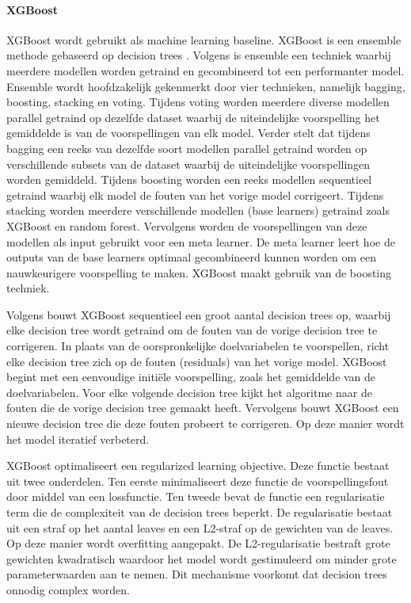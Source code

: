 \paragraph{XGBoost}

XGBoost wordt gebruikt als machine learning baseline. XGBoost is een ensemble methode gebaseerd op decision trees \autocite{Chen2016}. Volgens \textcite{Mahajan2023} is ensemble een techniek waarbij meerdere modellen worden getraind en gecombineerd tot een performanter model. Ensemble wordt hoofdzakelijk gekenmerkt door vier technieken, namelijk bagging, boosting, stacking en voting. Tijdens voting worden meerdere diverse modellen parallel getraind op dezelfde dataset waarbij de uiteindelijke voorspelling het gemiddelde is van de voorspellingen van elk model. Verder stelt \textcite{Zhang2022} dat tijdens bagging een reeks van dezelfde soort modellen parallel getraind worden op verschillende subsets van de dataset waarbij de uiteindelijke voorspellingen worden gemiddeld. Tijdens boosting worden een reeks modellen sequentieel getraind waarbij elk model de fouten van het vorige model corrigeert. Tijdens stacking worden meerdere verschillende modellen (base learners) getraind zoals XGBoost en random forest. Vervolgens worden de voorspellingen van deze modellen als input gebruikt voor een meta learner. De meta learner leert hoe de outputs van de base learners optimaal gecombineerd kunnen worden om een nauwkeurigere voorspelling te maken. XGBoost maakt gebruik van de boosting techniek.

Volgens \textcite{Chen2016} bouwt XGBoost sequentieel een groot aantal decision trees op, waarbij elke decision tree wordt getraind om de fouten van de vorige decision tree te corrigeren. In plaats van de oorspronkelijke doelvariabelen te voorspellen, richt elke decision tree zich op de fouten (residuals) van het vorige model. XGBoost begint met een eenvoudige initiële voorspelling, zoals het gemiddelde van de doelvariabelen. Voor elke volgende decision tree kijkt het algoritme naar de fouten die de vorige decision tree gemaakt heeft. Vervolgens bouwt XGBoost een nieuwe decision tree die deze fouten probeert te corrigeren. Op deze manier wordt het model iteratief verbeterd.

XGBoost optimaliseert een regularized learning objective. Deze functie bestaat uit twee onderdelen. Ten eerste minimaliseert deze functie de voorspellingsfout door middel van een lossfunctie. Ten tweede bevat de functie een regularisatie term die de complexiteit van de decision trees beperkt. De regularisatie bestaat uit een straf op het aantal leaves en een L2-straf op de gewichten van de leaves. Op deze manier wordt overfitting aangepakt. De L2-regularisatie bestraft grote gewichten kwadratisch waardoor het model wordt gestimuleerd om minder grote parameterwaarden aan te nemen. Dit mechanisme voorkomt dat decision trees onnodig complex worden.

